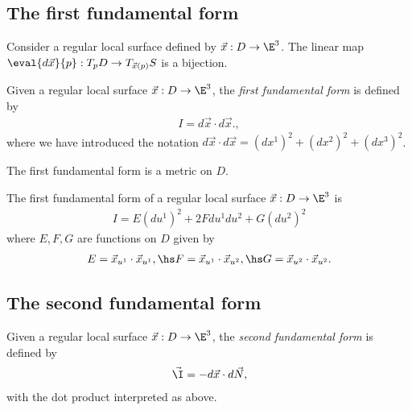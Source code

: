\documentclass{article}
\begin{document}
\subsection{The first fundamental form}

\begin{proposition}
    Consider a regular local surface defined by $\vec x: D\to \E^3$. The linear map
    $\eval{d\vec x}{p}:T_pD\to T_{\vec x(p)}S$ is a bijection.
\end{proposition}

\begin{definition}
    Given a regular local surface $\vec x: D\to\E^3$, the \emph{first fundamental form}
    is defined by 
    \begin{align*}
        I = d\vec x \cdot d\vec x.,
    \end{align*}
    where we have introduced the notation $d\vec x\cdot d\vec x=(dx^1)^2+(dx^2)^2+(dx^3)^2$.
\end{definition}

\begin{proposition}
    The first fundamental form is a metric on $D$.
\end{proposition}

\begin{proposition}
    The first fundamental form of a regular local surface $\vec x:D\to\E^3$ is
    \begin{align*}
        I = E(du^1)^2 + 2Fdu^1du^2+ G(du^2)^2
    \end{align*}
    where $E,F,G$ are functions on $D$ given by
    \begin{align*}
        E=\vec x_{u^1} \cdot \vec x_{u^1},\hs 
        F=\vec x_{u^1} \cdot \vec x_{u^2},\hs 
        G=\vec x_{u^2} \cdot \vec x_{u^2}.
    \end{align*}
\end{proposition}

\subsection{The second fundamental form}


\begin{definition}
    Given a regular local surface $\vec x: D\to\E^3$, the \emph{second fundamental form}
    is defined by 
    \begin{align*}
        \vec\I = -d\vec x\cdot d\vec N,
    \end{align*}
    with the dot product interpreted as above.
\end{definition}
\end{document}

